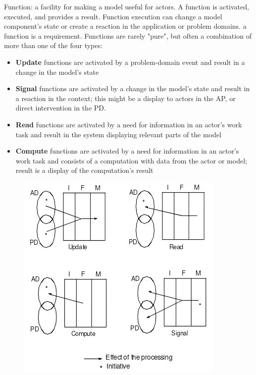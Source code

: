 Function: a facility for making a model useful for actors. A function is activated, executed, and provides a result. Function execution can change a model component's state or create a reaction in the application or problem domains. a function is a requirement. Functions are rarely "pure", but often a combination of more than one of the four types:

\begin{itemize}
    \item \textbf{Update} functions are activated by a problem-domain event and result in a change in the model's state
    \item \textbf{Signal} functions are activated by a change in the model's state and result in a reaction in the context; this might be a display to actors in the AP, or direct intervention in the PD.
    \item \textbf{Read} functions are activated by a need for information in an actor's work task and result in the system displaying relevant parts of the model
    \item \textbf{Compute} functions are activated by a need for information in an actor's work task and consists of a computation with data from the actor or model; result is a display of the computation's result
\end{itemize}

\begin{figure}[H]
    \centering
    \includegraphics[width=.5\textwidth]{figures/functiontypes.png}
\end{figure}


